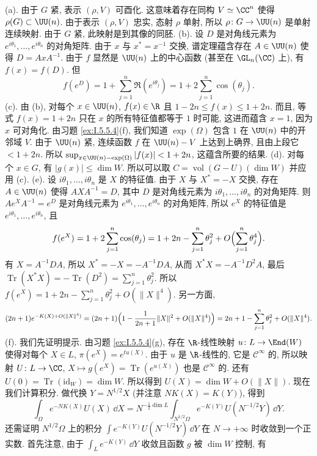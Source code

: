 \begin{solution}
(a). 由于 $G$ 紧, 表示 $(\rho, V)$ 可酉化. 这意味着存在同构 $V \simeq \CC^n$ 使得 $\rho(G) \subset \UU(n)$. 由于表示 $(\rho, V)$ 忠实, 态射 $\rho$ 单射, 所以 $\rho \colon G \to \UU(n)$ 是单射连续映射. 由于 $G$ 紧, 此映射是到其像的同胚.
(b). 设 $D$ 是对角线元素为 $e^{i\theta_1}, \ldots, e^{i\theta_n}$ 的对角矩阵. 由于 $x$ 与 $x^* = x^{-1}$ 交换, 谱定理蕴含存在 $A \in \UU(n)$ 使得 $D = AxA^{-1}$. 由于 $f$ 显然是 $\UU(n)$ 上的中心函数 (甚至在 $\GL_n(\CC)$ 上), 有 $f(x) = f(D)$. 但
\[
f(e^D) = 1 + \sum_{j=1}^n\Re(e^{i\theta_j}) = 1 + 2\sum_{j=1}^n\cos(\theta_j).
\]
(c). 由 (b), 对每个 $x \in \UU(n)$, $f(x) \in \R$ 且 $1 - 2n \leq f(x) \leq 1 + 2n$. 而且, 等式 $f(x) = 1 + 2n$ 只在 $x$ 的所有特征值都等于 $1$ 时可能, 这进而蕴含 $x = 1$, 因为 $x$ 可对角化.
由习题 \ref{ex:I.5.5.4}(f), 我们知道 $\exp(\Omega)$ 包含 $1$ 在 $\UU(n)$ 中的开邻域 $V$. 由于 $\UU(n)$ 紧, 连续函数 $f$ 在 $\UU(n) - V$ 上达到上确界, 且由上段它 $< 1 + 2n$. 所以 $\sup_{x \in \UU(n)-\exp(\Omega)}|f(x)| < 1 + 2n$, 这蕴含所要的结果.
(d). 对每个 $x \in G$, 有 $|g(x)| \leq \dim W$. 所以可以取 $C = \operatorname{vol}(G - U)(\dim W)$ 并应用 (c).
(e). 设 $i\theta_1, \ldots, i\theta_n$ 是 $X$ 的特征值. 由于 $X$ 与 $X^* = -X$ 交换, 存在 $A \in \UU(n)$ 使得 $AXA^{-1} = D$, 其中 $D$ 是对角线元素为 $i\theta_1, \ldots, i\theta_n$ 的对角矩阵. 则 $Ae^XA^{-1} = e^D$ 是对角线元素为 $e^{i\theta_1}, \ldots, e^{i\theta_n}$ 的对角矩阵, 所以 $e^X$ 的特征值是 $e^{i\theta_1}, \ldots, e^{i\theta_n}$, 且
\[
f(e^X) = 1 + 2\sum_{j=1}^n\cos(\theta_j) = 1 + 2n - \sum_{j=1}^n\theta_j^2 + O\Bigl(\sum_{j=1}^n\theta_j^4\Bigr).
\]
有 $X = A^{-1}DA$, 所以 $X^* = -X = -A^{-1}DA$, 从而 $X^*X = -A^{-1}D^2A$, 最后 $\operatorname{Tr}(X^*X) = -\operatorname{Tr}(D^2) = \sum_{j=1}^n\theta_j^2$. 所以 $f(e^X) = 1 + 2n - \sum_{j=1}^n\theta_j^2 + O(\|X\|^4)$. 另一方面,
\[
(2n+1)e^{-K(X)+O(\|X\|^4)} = (2n+1)\Bigl(1 - \frac{1}{2n+1}\|X\|^2 + O(\|X\|^4)\Bigr) = 2n+1 - \sum_{j=1}^n\theta_j^2 + O(\|X\|^4).
\]
(f). 我们先证明提示. 由习题 \ref{ex:I.5.5.4}(g), 存在 $\R$-线性映射 $u \colon L \to \End(W)$ 使得对每个 $X \in L$, $\pi(e^X) = e^{tu(X)}$. 由于 $u$ 是 $\R$-线性的, 它是 $\mathcal{C}^{\infty}$ 的, 所以映射 $U \colon L \to \CC$, $X \longmapsto g(e^X) = \operatorname{Tr}(e^{u(X)})$ 也是 $\mathcal{C}^{\infty}$ 的. 还有 $U(0) = \operatorname{Tr}(\mathrm{id}_W) = \dim W$. 所以得到 $U(X) = \dim W + O(\|X\|)$.
现在我们计算积分. 做代换 $Y = N^{1/2}X$ (并注意 $NK(X) = K(Y)$), 得到
\[
\int_{\Omega}e^{-NK(X)}U(X)\,\dd X = N^{-\frac{1}{2}\dim L}\int_{N^{1/2}\Omega}e^{-K(Y)}U(N^{-1/2}Y)\,\dd Y.
\]
还需证明 $N^{1/2}\Omega$ 上的积分 $\int e^{-K(Y)}U(N^{-1/2}Y)\,\dd Y$ 在 $N \to +\infty$ 时收敛到一个正实数. 首先注意, 由于 $\int_Le^{-K(Y)}\,\dd Y$ 收敛且函数 $g$ 被 $\dim W$ 控制, 有

\end{solution}
